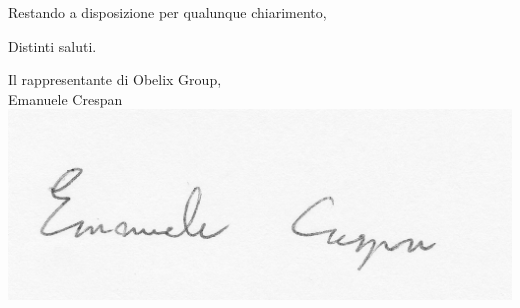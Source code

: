 \documentclass[10pt,stdletter,dateno,sigright]{newlfm} %
\begin{document}
\vspace{.5in}
Restando a disposizione per qualunque chiarimento,\\

\vspace{.1in}

Distinti saluti.

\vspace{.15in}


\begin{flushright}
Il rappresentante di Obelix Group,\\
	Emanuele Crespan\\
\includegraphics[width=.5\textwidth]{../../file_comuni/firme/ec.jpg}
\end{flushright}
\end{document}
